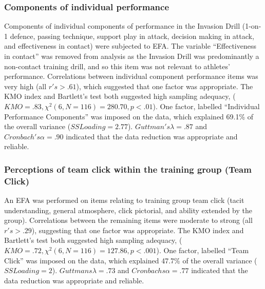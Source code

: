 \begin{CJK}{UTF8}{gbsn}
\subsubsection{Components of individual performance\label{app9:dataReductionPerformance}}
Components of individual components of performance in the Invasion Drill (1-on-1 defence, passing technique, support play in attack, decision making in attack, and effectiveness in contact) were subjected to EFA.  The variable ``Effectiveness in contact'' was removed from analysis as the Invasion Drill was predominantly a non-contact training drill, and so this item was not relevant to athletes' performance.  Correlations between individual component performance items was very high (all $r's > .61$), which suggested that one factor was appropriate.  The KMO index and Bartlett's test both suggested high sampling adequacy, ($KMO = .83, \chi^2(6, N = 116) = 280.70, p < .01$). One factor, labelled ``Individual Performance Components'' was imposed on the data, which explained 69.1\% of the overall variance ($SS Loading = 2.77$).  $Guttman's \lambda = .87$  and  $Cronbach's \alpha = .90$ indicated that the data reduction was appropriate and reliable.

\subsubsection{Perceptions of team click within the training group (Team Click)}
An EFA was performed on items relating to training group team click (tacit understanding, general atmosphere, click pictorial, and ability extended by the group).  Correlations between the remaining items were moderate to strong (all $r's > .29$), suggesting that one factor was appropriate. The KMO index and Bartlett's test both suggested high sampling adequacy, ($KMO =  .72, \chi^2(6, N = 116) = 127.86, p < .001$).
One factor, labelled ``Team Click'' was imposed on the data, which explained 47.7\% of the overall variance ($SS Loading = 2$). $Guttmans \lambda = .73$ and $Cronbachs \alpha = .77$ indicated that the data reduction was appropriate and reliable.



\end{CJK}
